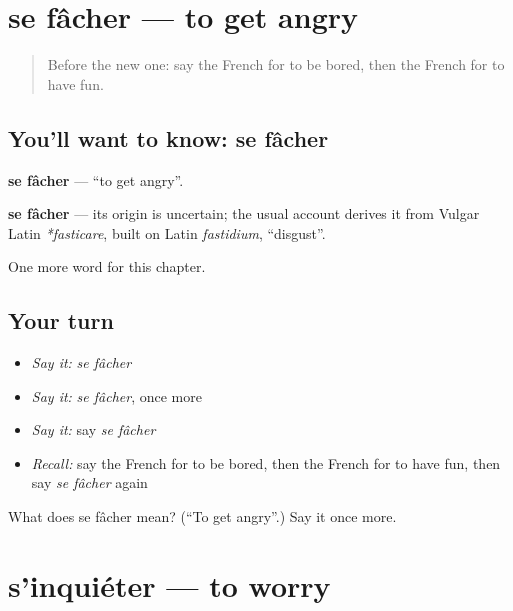 \section[se fâcher]{se fâcher — to get angry}

\label{lesson:FR-C146-facher}



\begin{quote}
Before the new one: say the French for to be bored, then the French for to have fun.
\end{quote}

\subsection*{You'll want to know: se fâcher}
\textbf{se fâcher} — \textquotedblleft{}to get angry\textquotedblright{}.

\begin{cousinweb}
\textbf{se fâcher} — its origin is uncertain; the usual account derives it from Vulgar Latin \emph{*fasticare}, built on Latin \emph{fastidium}, \textquotedblleft{}disgust\textquotedblright{}.
\end{cousinweb}

\begin{grammarlens}[title={What you've built}]
One more word for this chapter.
\end{grammarlens}

\subsection*{Your turn}
\begin{itemize}
\raggedright
  \item \emph{Say it:} \emph{se fâcher}
  \item \emph{Say it:} \emph{se fâcher}, once more
  \item \emph{Say it:} say \emph{se fâcher}
  \item \emph{Recall:} say the French for to be bored, then the French for to have fun, then say \emph{se fâcher} again
\end{itemize}

\begin{tcolorbox}[breakable,colback=teal!4,colframe=teal!35!black,title={Before you move on}]
What does se fâcher mean? (\textquotedblleft{}To get angry\textquotedblright{}.) Say it once more.
\end{tcolorbox}
\section[s'inquiéter]{s'inquiéter — to worry}

